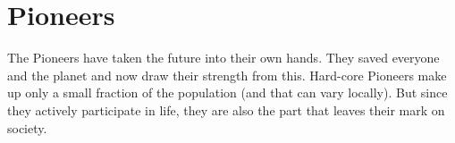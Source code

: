 \section{Pioneers}

The Pioneers have taken the future into their own hands. They saved everyone and the planet and now draw their strength from this.
Hard-core Pioneers make up only a small fraction of the population (and that can vary locally). But since they actively participate in life, they are also the part that leaves their mark on society.

